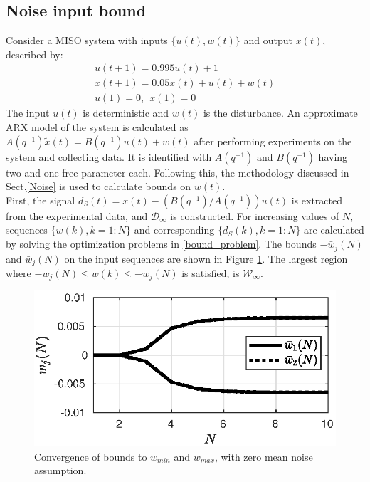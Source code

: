 \documentclass[letterpaper, 10 pt, conference]{ieeeconf}  %
\begin{document}
	\subsection{Noise input bound}
	Consider a MISO system with inputs $\{u(t),w(t)\}$ and output $x(t)$, described by:
	\begin{equation*}
	\begin{matrix}
	u(t+1) = 0.995u(t)+1 \\
	x(t+1) = 0.05x(t)+u(t)+w(t) \\
	u(1) = 0, \hspace{5pt} x(1) = 0
	\end{matrix}
	\end{equation*}
	The input $u(t)$ is deterministic and $w(t)$ is the disturbance. An approximate ARX model of the system is calculated as $A(q^{-1})\tilde{x}(t) = B(q^{-1})u(t)+w(t)$ after performing experiments on the system and collecting data. It is identified with $A(q^{-1})$ and $B(q^{-1})$ having two and one free parameter each. Following this, the methodology discussed in Sect.\ref{Noise} is used to calculate bounds on $w(t)$.
	\\
	First, the signal $d_S(t)=x(t) - (B(q^{-1})/A(q^{-1}))u(t)$ is extracted from the experimental data, and $\mathcal{D}_{\infty}$ is constructed. For increasing values of $N$, sequences $\{w(k),k=1:N\}$ and corresponding $\{d_S(k),k=1:N\}$ are calculated by solving the optimization problems in \eqref{bound_problem}. The bounds $-\bar{w}_j(N)$ and $\bar{w}_j(N)$ on the input sequences are shown in Figure \ref{bounds}.
	The largest region where $-\bar{w}_j(N) \leq w(k) \leq -\bar{w}_j(N)$ is satisfied, is $\mathcal{W}_{\infty}$. 
		\begin{figure}[h!]
			\hspace{30pt}
			\includegraphics[scale = 0.60]{bounds.eps}
			\caption{Convergence of bounds to $w_{min}$ and $w_{max}$, with zero mean noise assumption.}
			\label{bounds}
		\end{figure} \vspace{-5pt}\\
\end{document}

